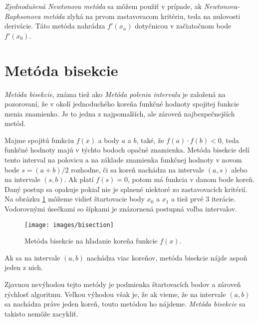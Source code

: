 \textit{Zjednodušená Newtonova metóda} sa môžem použiť v prípade, ak \textit{Newtonova-Raphsonova metóda} zlyhá na prvom 
zastavovacom kritériu, teda na nulovosti derivácie. Táto metóda nahrádza $f'(x_n)$ dotyčnicou v začiatočnom bode $f'(x_0)$.  
\fi

\section{Metóda bisekcie}

\textit{Metóda bisekcie}, známa tiež ako \textit{Metóda polenia intervalu} je založená 
na pozorovaní, že v okolí jednoduchého koreňa funkčné hodnoty spojitej funkcie menia znamienko. 
Je to jedna z najpomalších, ale zároveň najbezpečnejších metód.

Majme spojitú funkciu $f(x)$ a body $a$ a $b$, také, že $f(a) \cdot f(b) < 0$, teda 
funkčné hodnoty majú v týchto bodoch opačné znamienka. Metóda bisekcie delí tento 
interval na polovicu a na základe znamienka funkčnej hodnoty v novom bode $s = (a+b)/2$
rozhodne, či sa koreň nachádza na intervale $(a, s)$ alebo na intervale $(s, b)$. 
Ak platí $f(s) = 0$, potom má funkcia v danom bode koreň. Daný postup sa opakuje
pokiaľ nie je splnené niektoré zo zastavovacích kritérií. Na obrázku \ref{obr:bisection}
môžeme vidieť štartovacie body $x_0$ a $x_1$ a tiež prvé 3 iterácie. Vodorovnými
úsečkami so šípkami je znázornená postupná voľba intervalov. 

\begin{figure}
    \centerline{\texttt{[image: images/bisection]}}
    \caption[Metóda bisekcie]{Metóda bisekcie na hľadanie koreňa funkcie $f(x)$.}
    \label{obr:bisection}
\end{figure}

Ak sa na intervale $(a, b)$ nachádza viac koreňov, metóda bisekcie nájde aspoň jeden z nich.

Zjavnou nevýhodou tejto metódy je podmienka štartovacích bodov a zároveň rýchlosť algoritmu. 
Veľkou výhodou však je, že ak vieme, že na intervale $(a, b)$ sa nachádza práve jeden koreň, 
touto metódou ho nájdeme. \textit{Metóda bisekcie} sa takisto nemôže zacykliť.

